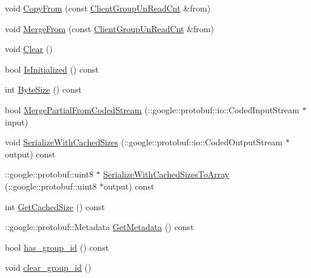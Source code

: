\begin{DoxyCompactItemize}
\item 
void \hyperlink{class_i_m_1_1_base_define_1_1_client_group_un_read_cnt_a6bd854e90e5117cf3a0651aa32602e75}{Copy\+From} (const \hyperlink{class_i_m_1_1_base_define_1_1_client_group_un_read_cnt}{Client\+Group\+Un\+Read\+Cnt} \&from)
\item 
void \hyperlink{class_i_m_1_1_base_define_1_1_client_group_un_read_cnt_a9978ba905a00421267ce8fc005e4e7a6}{Merge\+From} (const \hyperlink{class_i_m_1_1_base_define_1_1_client_group_un_read_cnt}{Client\+Group\+Un\+Read\+Cnt} \&from)
\item 
void \hyperlink{class_i_m_1_1_base_define_1_1_client_group_un_read_cnt_aa8990e938ea726115b8feaa2467a92ae}{Clear} ()
\item 
bool \hyperlink{class_i_m_1_1_base_define_1_1_client_group_un_read_cnt_ac7bbd2642b3780ad41068bb2d75c2d49}{Is\+Initialized} () const 
\item 
int \hyperlink{class_i_m_1_1_base_define_1_1_client_group_un_read_cnt_a019b4bbf64acc069eef85300016ec625}{Byte\+Size} () const 
\item 
bool \hyperlink{class_i_m_1_1_base_define_1_1_client_group_un_read_cnt_ac1103dd78cf612ac3c9aabcddfd5f210}{Merge\+Partial\+From\+Coded\+Stream} (\+::google\+::protobuf\+::io\+::\+Coded\+Input\+Stream $\ast$input)
\item 
void \hyperlink{class_i_m_1_1_base_define_1_1_client_group_un_read_cnt_a1042c82e35ac8526f2a4b2638da857e2}{Serialize\+With\+Cached\+Sizes} (\+::google\+::protobuf\+::io\+::\+Coded\+Output\+Stream $\ast$output) const 
\item 
\+::google\+::protobuf\+::uint8 $\ast$ \hyperlink{class_i_m_1_1_base_define_1_1_client_group_un_read_cnt_a537e5587cac03efb2dcdf48a0306b758}{Serialize\+With\+Cached\+Sizes\+To\+Array} (\+::google\+::protobuf\+::uint8 $\ast$output) const 
\item 
int \hyperlink{class_i_m_1_1_base_define_1_1_client_group_un_read_cnt_ad4f1dc998271123286536ce88886a836}{Get\+Cached\+Size} () const 
\item 
\+::google\+::protobuf\+::\+Metadata \hyperlink{class_i_m_1_1_base_define_1_1_client_group_un_read_cnt_a993d508435895b4c969ea5dcfb796e6e}{Get\+Metadata} () const 
\item 
bool \hyperlink{class_i_m_1_1_base_define_1_1_client_group_un_read_cnt_a2b9f8f3133953f5d6489da89da925a6d}{has\+\_\+group\+\_\+id} () const 
\item 
void \hyperlink{class_i_m_1_1_base_define_1_1_client_group_un_read_cnt_a46b176c695409a2c4300e4a4459ab47f}{clear\+\_\+group\+\_\+id} ()

\end{DoxyCompactItemize}
